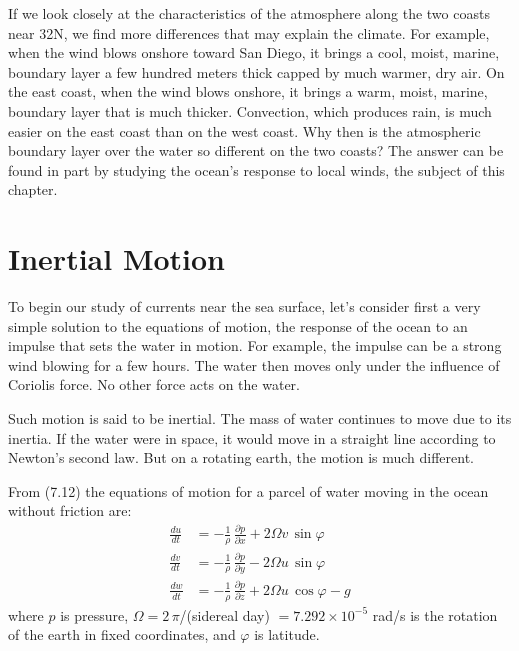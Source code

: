 If we look closely at the characteristics of the atmosphere along the
two coasts near 32\degrees N, we find more differences that may
explain the climate. For example, when the wind blows onshore toward
San Diego, it brings a cool, moist, marine, boundary layer a few
hundred meters thick capped by much warmer, dry air. On the east
coast, when the wind blows onshore, it brings a warm, moist, marine,
boundary layer that is much thicker. Convection, which produces rain,
is much easier on the east coast than on the west coast. Why then is
the atmospheric boundary layer over the water so different on the two
coasts? The answer can be found in part by studying the ocean's
response to local winds, the subject of this chapter.

\section{Inertial Motion}
To begin our study of currents near the sea
surface, let's consider first a very simple solution to the equations
of motion, the response of the ocean to an impulse that sets the water
in motion.  For example, the impulse can be a strong wind blowing for
a few hours. The water then moves only under the influence of Coriolis
force. No other force acts on the water.

Such motion is said to be inertial. The mass of water continues to
move due to its inertia. If the water were in space, it would move in
a straight line according to Newton's second law. But on a rotating
earth, the motion is much different.

From (7.12) the equations of motion for a parcel of water moving in
the ocean without friction are:
\begin{subequations}
\begin{align}
\frac{du}{dt}&=-\frac{1}{\rho}\,\frac{\partial{p}}{\partial{x}} + 2\Omega v\,\sin\varphi \\
\frac{dv}{dt}&=-\frac{1}{\rho}\,\frac{\partial{p}}{\partial{y}} - 2\Omega u\,\sin\varphi \\
\frac{dw}{dt}&=-\frac{1}{\rho}\,\frac{\partial{p}}{\partial{z}} + 2\Omega u\,\cos\varphi - g
\end{align}
\end{subequations}
where $p$ is pressure, $\Omega = 2\,\pi$/(sidereal day)
$= 7.292 \times 10^{-5}$ rad/s is the rotation of the earth in fixed
coordinates, and $\varphi$ is latitude.


